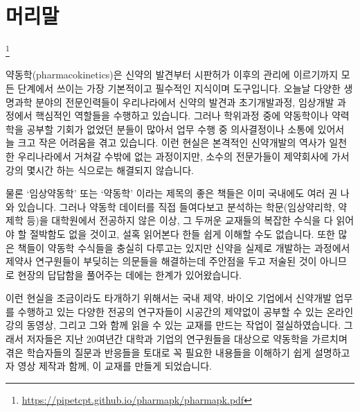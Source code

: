 \documentclass[
  11pt,
  krantz2, a4paper, twoside]{krantz}
\renewcommand{\href}[2]{#2\footnote{\url{#1}}}
\begin{document}
\setlength{\abovedisplayskip}{-5pt}
\setlength{\abovedisplayshortskip}{-5pt}

\newpage\thispagestyle{empty}\null

{
\hypersetup{linkcolor=}
\setcounter{tocdepth}{2}
\tableofcontents
}
\hypertarget{uxba38uxb9acuxb9d0}{%
\chapter*{머리말}\label{uxba38uxb9acuxb9d0}}


\href{https://pipetcpt.github.io/pharmapk/pharmapk.pdf}{}

\normalsize

약동학(pharmacokinetics)은 신약의 발견부터 시판허가 이후의 관리에
이르기까지 모든 단계에서 쓰이는 가장 기본적이고 필수적인 지식이며
도구입니다. 오늘날 다양한 생명과학 분야의 전문인력들이 우리나라에서
신약의 발견과 초기개발과정, 임상개발 과정에서 핵심적인 역할들을 수행하고
있습니다. 그러나 학위과정 중에 약동학이나 약력학을 공부할 기회가 없었던
분들이 많아서 업무 수행 중 의사결정이나 소통에 있어서 늘 크고 작은
어려움을 겪고 있습니다. 이런 현실은 본격적인 신약개발의 역사가 일천한
우리나라에서 거쳐갈 수밖에 없는 과정이지만, 소수의 전문가들이 제약회사에
가서 강의 몇시간 하는 식으로는 해결되지 않습니다.

물론 `임상약동학' 또는 `약동학' 이라는 제목의 좋은 책들은 이미 국내에도
여러 권 나와 있습니다. 그러나 약동학 데이터를 직접 들여다보고 분석하는
학문(임상약리학, 약제학 등)을 대학원에서 전공하지 않은 이상, 그 두꺼운
교재들의 복잡한 수식을 다 읽어야 할 절박함도 없을 것이고, 설혹 읽어본다
한들 쉽게 이해할 수도 없습니다. 또한 많은 책들이 약동학 수식들을 충실히
다루고는 있지만 신약을 실제로 개발하는 과정에서 제약사 연구원들이
부딪히는 의문들을 해결하는데 주안점을 두고 저술된 것이 아니므로 현장의
답답함을 풀어주는 데에는 한계가 있어왔습니다.

이런 현실을 조금이라도 타개하기 위해서는 국내 제약, 바이오 기업에서
신약개발 업무를 수행하고 있는 다양한 전공의 연구자들이 시공간의 제약없이
공부할 수 있는 온라인 강의 동영상, 그리고 그와 함께 읽을 수 있는 교재를
만드는 작업이 절실하였습니다. 그래서 저자들은 지난 20여년간 대학과
기업의 연구원들을 대상으로 약동학을 가르치며 겪은 학습자들의 질문과
반응들을 토대로 꼭 필요한 내용들을 이해하기 쉽게 설명하고자 영상 제작과
함께, 이 교재를 만들게 되었습니다.
\end{document}
